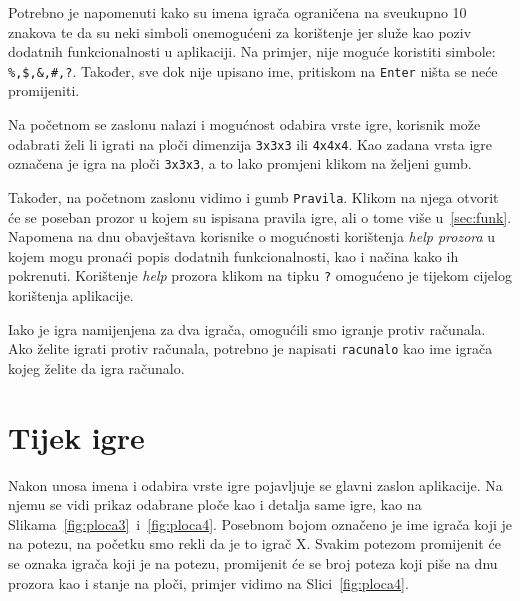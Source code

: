 \documentclass[12pt]{scrartcl}
\begin{document}
Potrebno je napomenuti kako su imena igrača ograničena na sveukupno 10 znakova te da su neki simboli onemogućeni za korištenje jer služe kao poziv dodatnih funkcionalnosti u aplikaciji. Na primjer, nije moguće koristiti simbole: \texttt{\%,\$,\&,\#,?}. Također, sve dok nije upisano ime, pritiskom na \texttt{Enter} ništa se neće promijeniti.

Na početnom se zaslonu nalazi i mogućnost odabira vrste igre, korisnik može odabrati želi li igrati na ploči dimenzija \texttt{3x3x3} ili \texttt{4x4x4}. Kao zadana vrsta igre označena je igra na ploči \texttt{3x3x3}, a to lako promjeni klikom na željeni gumb. 

Također, na početnom zaslonu vidimo i gumb \texttt{Pravila}. Klikom na njega otvorit će se poseban prozor u kojem su ispisana pravila igre, ali o tome više u~\ref{sec:funk}. Napomena na dnu obavještava korisnike o mogućnosti korištenja \emph{help prozora} u kojem mogu pronaći popis dodatnih funkcionalnosti, kao i načina kako ih pokrenuti. Korištenje \emph{help} prozora klikom na tipku \texttt{?} omogućeno je tijekom cijelog korištenja aplikacije.

Iako je igra namijenjena za dva igrača, omogućili smo igranje protiv računala. Ako želite igrati protiv računala, potrebno je napisati \texttt{racunalo} kao ime igrača kojeg želite da igra računalo.

\newpage \section{Tijek igre}
Nakon unosa imena i odabira vrste igre pojavljuje se glavni zaslon aplikacije. Na njemu se vidi prikaz odabrane ploče kao i detalja same igre, kao na Slikama~\ref{fig:ploca3}~i~\ref{fig:ploca4}. Posebnom bojom označeno je ime igrača koji je na potezu, na početku smo rekli da je to igrač X. Svakim potezom promijenit će se oznaka igrača koji je na potezu, promijenit će se broj poteza koji piše na dnu prozora kao i stanje na ploči, primjer vidimo na Slici~\ref{fig:ploca4}.
\end{document}
